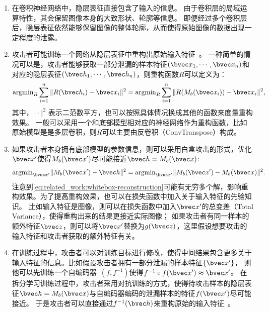 \begin{enumerate}
    \item 在卷积神经网络中，隐层表征直接包含了输入的信息\cite{abuadbba2020can_split}。
    由于卷积层的局域运算特性，其会保留图像本身的大致形状、轮廓等信息。
    即便经过多个卷积层后，隐层表征依然能够保留图像的整体轮廓，从而使得原始图像的数据出现一定程度的泄露。
    \item 攻击者可能训练一个网络从隐层表征中重构出原始输入特征~\cite{vepakomma2020nopeek,hezecheng_2019_model_inversion_attack}。
    一种简单的情况可以是，攻击者能够获取一部分泄漏的样本特征$(\bvec x_1, \cdots, \bvec x_n)$和对应的隐层表征$(\bvec h_1, \cdots, \bvec h_n)$，则重构函数$R$可以定义为：
    \begin{equation}
        \text{argmin}_{R} \sum_{i=1}^n \Vert R(\bvec h_i) - \bvec x_i\Vert^2 = \text{argmin}_{R} \sum_{i=1}^n \Vert R(M_b(\bvec x_i)) - \bvec x_i\Vert^2,
    \end{equation}
    其中，$\Vert \cdot\Vert^2$ 表示二范数平方，也可以按照具体情况换成其他的函数来度量重构效果。
    一般可以采用一个和底部模型相对应的神经网络作为重构函数，比如原始模型是是多层卷积，则$R$可以主要由反卷积（ConvTranspose）构成。
    \item 如果攻击者本身拥有底部模型的参数信息，则可以采用白盒攻击的形式，优化$\bvec x'$使得$M_b(\bvec x')$尽可能接近$\bvec h = M_b(\bvec x)$:~\cite{hezecheng_2019_model_inversion_attack,luoxinjian2021feature_attack}
    \begin{equation}
    \label{eq:related_work:whitebox-reconstruction}
        \text{argmin}_{\bvec x'} \Vert M_b(\bvec x') - \bvec h\Vert^2 = \text{argmin}_{\bvec x'} \Vert M_b(\bvec x') - M_b(\bvec x)\Vert^2.
    \end{equation}
    注意到\autoref{eq:related_work:whitebox-reconstruction}可能有无穷多个解，影响重构效果。为了提高重构效果，也可以在损失函数中加入关于输入特征的先验知识。
    比如输入特征是图像，则可以在损失函数中加入$\bvec x'$的总变差（Total Variance），使得重构出来的结果更接近实际图像；
    如果攻击者有同一样本的额外特征$\bvec z$，则可以将$\bvec x'$替换为$g(\bvec z)$，这里假设想要攻击的输入特征和攻击者获取的额外特征有关。
    \item 在训练过程中，攻击者可以对训练目标进行修改，使得中间结果包含更多关于输入特征的信息。比如假设攻击者拥有一部分泄漏的样本特征$\{ \bvec x' \}$，
    则他可以先训练一个自编码器~\cite{kramer1991autoencoder,baldi2012autoencoders}$(f,f^{-1})$使得$f^{-1}\circ f(\bvec x')\approx \bvec x'$。
    在拆分学习训练过程中，攻击者采用对抗训练的方式，使得待攻击样本的隐层表征$\bvec h = M_b(\bvec x)$与自编码器编码的泄漏样本的特征$f(\bvec x')$尽可能接近。
    于是攻击者可以直接通过$f^{-1}(\bvec h)$来重构原始的输入特征~\cite{pasquini2921inference_attack_tiger}。
\end{enumerate}

